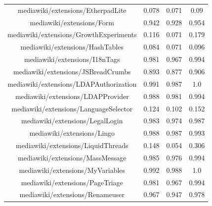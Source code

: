 \begin{table}[H]
\begin{tabular}{@{}c c c c@{}}
mediawiki/extensions/EtherpadLite & 0.078 & 0.071 & 0.09 \\
mediawiki/extensions/Form & 0.942 & 0.928 & 0.954 \\
mediawiki/extensions/GrowthExperiments & 0.116 & 0.071 & 0.179 \\
mediawiki/extensions/HashTables & 0.084 & 0.071 & 0.096 \\
mediawiki/extensions/I18nTags & 0.981 & 0.967 & 0.994 \\
mediawiki/extensions/JSBreadCrumbs & 0.893 & 0.877 & 0.906 \\
mediawiki/extensions/LDAPAuthorization & 0.991 & 0.987 & 1.0 \\
mediawiki/extensions/LDAPProvider & 0.988 & 0.981 & 0.994 \\
mediawiki/extensions/LanguageSelector & 0.124 & 0.102 & 0.152 \\
mediawiki/extensions/LegalLogin & 0.983 & 0.974 & 0.987 \\
mediawiki/extensions/Lingo & 0.988 & 0.987 & 0.993 \\
mediawiki/extensions/LiquidThreads & 0.148 & 0.054 & 0.306 \\
mediawiki/extensions/MassMessage & 0.985 & 0.976 & 0.994 \\
mediawiki/extensions/MyVariables & 0.992 & 0.988 & 1.0 \\
mediawiki/extensions/PageTriage & 0.981 & 0.967 & 0.994 \\
mediawiki/extensions/Renameuser & 0.967 & 0.947 & 0.978 \\
\hline
\end{tabular}
    \label{table:accuracy-score-repo-specific-and-generic-appendix-c-part-1}
\end{table}

